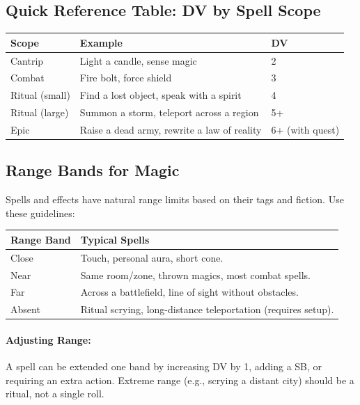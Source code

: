 \subsection*{Quick Reference Table: DV by Spell Scope}
\label{subsec:dv-spell-scope}
\begin{center}
\begin{tabular}{lll}
\toprule
\textbf{Scope} & \textbf{Example} & \textbf{DV} \\
\midrule
Cantrip & Light a candle, sense magic & 2 \\
Combat & Fire bolt, force shield & 3 \\
Ritual (small) & Find a lost object, speak with a spirit & 4 \\
Ritual (large) & Summon a storm, teleport across a region & 5+ \\
Epic & Raise a dead army, rewrite a law of reality & 6+ (with quest) \\
\bottomrule
\end{tabular}
\end{center}

\subsection*{Range Bands for Magic}
Spells and effects have natural range limits based on their tags and fiction. Use these guidelines:

\begin{center}
\begin{tabular}{ll}
\toprule
\textbf{Range Band} & \textbf{Typical Spells} \\
\midrule
Close & Touch, personal aura, short cone. \\
Near & Same room/zone, thrown magics, most combat spells. \\
Far & Across a battlefield, line of sight without obstacles. \\
Absent & Ritual scrying, long-distance teleportation (requires setup). \\
\bottomrule
\end{tabular}
\end{center}

\paragraph{Adjusting Range:} A spell can be extended one band by increasing DV by 1, adding a SB, or requiring an extra action. Extreme range (e.g., scrying a distant city) should be a ritual, not a single roll.

